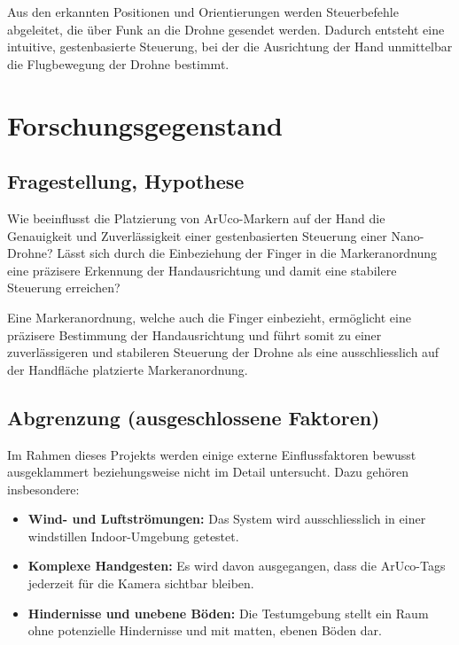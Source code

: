 Aus den erkannten Positionen und Orientierungen werden Steuerbefehle abgeleitet, die über Funk an die Drohne gesendet werden.
Dadurch entsteht eine intuitive, gestenbasierte Steuerung, bei der die Ausrichtung der Hand unmittelbar die Flugbewegung der Drohne bestimmt.

\section{Forschungsgegenstand}
\subsection{Fragestellung, Hypothese}
Wie beeinflusst die Platzierung von ArUco-Markern auf der Hand die Genauigkeit und Zuverlässigkeit einer gestenbasierten Steuerung einer Nano-Drohne?  
Lässt sich durch die Einbeziehung der Finger in die Markeranordnung eine präzisere Erkennung der Handausrichtung und damit eine stabilere Steuerung erreichen?

Eine Markeranordnung, welche auch die Finger einbezieht, ermöglicht eine präzisere Bestimmung der Handausrichtung und führt somit zu einer zuverlässigeren und stabileren Steuerung der Drohne als eine ausschliesslich auf der Handfläche platzierte Markeranordnung.

\subsection{Abgrenzung (ausgeschlossene Faktoren)}
Im Rahmen dieses Projekts werden einige externe Einflussfaktoren bewusst ausgeklammert beziehungsweise nicht im Detail untersucht.
Dazu gehören insbesondere:
\begin{itemize}
  \item \textbf{Wind- und Luftströmungen:} Das System wird ausschliesslich in einer windstillen Indoor-Umgebung getestet.
  \item \textbf{Komplexe Handgesten:} Es wird davon ausgegangen, dass die ArUco-Tags jederzeit für die Kamera sichtbar bleiben.
  \item \textbf{Hindernisse und unebene Böden:} Die Testumgebung stellt ein Raum ohne potenzielle Hindernisse und mit matten, ebenen Böden dar.\footnotemark{}
\end{itemize}

\endgroup